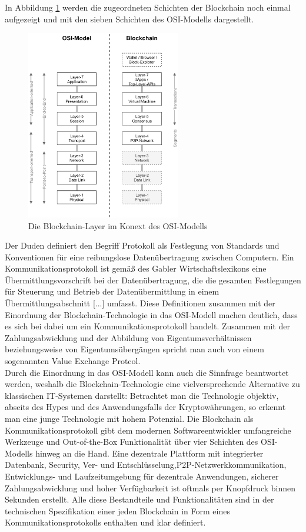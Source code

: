 In Abbildung \ref{fig:chapter02:osi_blockchain} werden die zugeordneten Schichten der Blockchain noch einmal aufgezeigt und mit den sieben Schichten des \ac{OSI}-Modells dargestellt.

\begin{figure}[htbp]
 \centering
 \includegraphics[width=0.6\textwidth]{gfx/osi_blockchain.png}
 \caption{Die Blockchain-Layer im Konext des OSI-Modells}
 \label{fig:chapter02:osi_blockchain}
\end{figure}

Der Duden definiert den Begriff Protokoll als \glqq Festlegung von Standards und Konventionen für eine reibungslose Datenübertragung zwischen Computern\grqq. Ein Kommunikationsprotokoll ist gemäß des Gabler Wirtschaftslexikons \glqq eine Übermittlungsvorschrift bei der Datenübertragung, die die gesamten Festlegungen für Steuerung und Betrieb der Datenübermittlung in einem Übermittlungsabschnitt [...] umfasst\grqq. Diese Definitionen zusammen mit der Einordnung der Blockchain-Technologie in das \ac{OSI}-Modell machen deutlich, dass es sich bei dabei um ein Kommunikationsprotokoll handelt. Zusammen mit der Zahlungsabwicklung und der Abbildung von Eigentumsverhältnissen beziehungsweise von Eigentumsübergängen spricht man auch von einem sogenannten \glqq Value Exchange Protcol\grqq \cite{bheemaiah2015}.\\
Durch die Einordnung in das \ac{OSI}-Modell kann auch die Sinnfrage beantwortet werden, weshalb die Blockchain-Technologie eine vielversprechende Alternative zu klassischen IT-Systemen darstellt: Betrachtet man die Technologie objektiv, abseits des Hypes und des Anwendungsfalls der Kryptowährungen, so erkennt man eine junge Technologie mit hohem Potenzial. Die Blockchain als Kommunikationsprotokoll gibt dem modernen Softwareentwickler umfangreiche Werkzeuge und Out-of-the-Box Funktionalität über vier Schichten des \ac{OSI}-Modells hinweg an die Hand. Eine dezentrale Plattform mit integrierter Datenbank, Security, Ver- und Entschlüsselung,\ac{P2P}-Netzwerkkommunikation, Entwicklungs- und Laufzeitumgebung für dezentrale Anwendungen, sicherer Zahlungsabwicklung und hoher Verfügbarkeit ist oftmals per Knopfdruck binnen Sekunden erstellt. Alle diese Bestandteile und Funktionalitäten sind in der technischen Spezifikation einer jeden Blockchain in Form eines Kommunikationsprotokolls enthalten und klar definiert.


